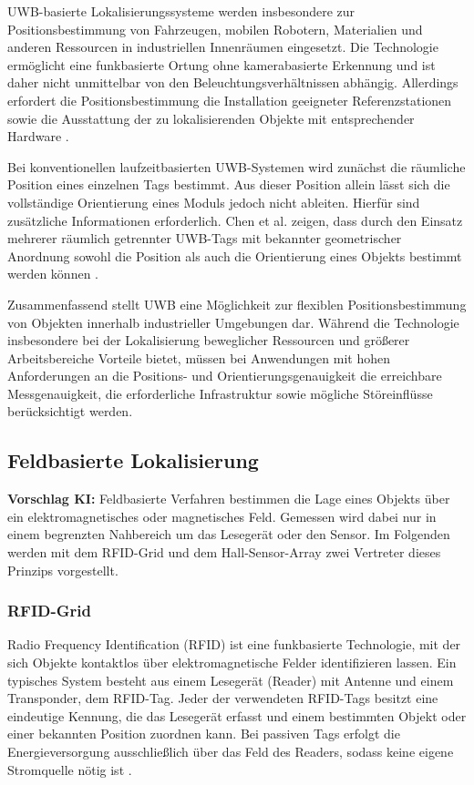 UWB-basierte Lokalisierungssysteme werden insbesondere zur Positionsbestimmung von Fahrzeugen, mobilen Robotern, Materialien und anderen Ressourcen in industriellen Innenräumen eingesetzt. Die Technologie ermöglicht eine funkbasierte Ortung ohne kamerabasierte Erkennung und ist daher nicht unmittelbar von den Beleuchtungsverhältnissen abhängig. 
Allerdings erfordert die Positionsbestimmung die Installation geeigneter Referenzstationen sowie die Ausstattung der zu lokalisierenden Objekte mit entsprechender Hardware \cite{Elsanhoury2022}.

Bei konventionellen laufzeitbasierten UWB-Systemen wird zunächst die räumliche Position eines einzelnen Tags bestimmt. Aus dieser Position allein lässt sich die vollständige Orientierung eines Moduls jedoch nicht ableiten. Hierfür sind zusätzliche Informationen erforderlich. Chen et al. zeigen, dass durch den Einsatz mehrerer räumlich getrennter UWB-Tags mit bekannter geometrischer Anordnung sowohl die Position als auch die Orientierung eines Objekts bestimmt werden können \cite{Chen2025UWB}.

Zusammenfassend stellt UWB eine Möglichkeit zur flexiblen Positionsbestimmung von Objekten innerhalb industrieller Umgebungen dar. Während die Technologie insbesondere bei der Lokalisierung beweglicher Ressourcen und größerer Arbeitsbereiche Vorteile bietet, müssen bei Anwendungen mit hohen Anforderungen an die Positions- und Orientierungsgenauigkeit die erreichbare Messgenauigkeit, die erforderliche Infrastruktur sowie mögliche Störeinflüsse berücksichtigt werden.

\subsection{Feldbasierte Lokalisierung}

\textbf{Vorschlag KI:} Feldbasierte Verfahren bestimmen die Lage eines Objekts über ein elektromagnetisches oder magnetisches Feld. Gemessen wird dabei nur in einem begrenzten Nahbereich um das Lesegerät oder den Sensor. Im Folgenden werden mit dem RFID-Grid und dem Hall-Sensor-Array zwei Vertreter dieses Prinzips vorgestellt.



\subsubsection{RFID-Grid}

Radio Frequency Identification (RFID) ist eine funkbasierte Technologie, mit der sich Objekte kontaktlos über elektromagnetische Felder identifizieren lassen. Ein typisches System besteht aus einem Lesegerät (Reader) mit Antenne und einem Transponder, dem RFID-Tag. Jeder der verwendeten RFID-Tags besitzt eine eindeutige Kennung, die das Lesegerät erfasst und einem bestimmten Objekt oder einer bekannten Position zuordnen kann. Bei passiven Tags erfolgt die Energieversorgung ausschließlich über das Feld des Readers, sodass keine eigene Stromquelle nötig ist \cite{MiTakahashi2016}.

